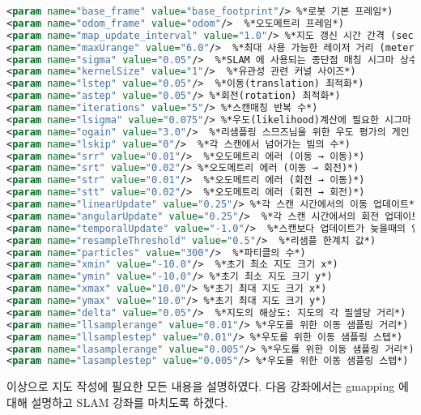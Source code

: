 \vspace{\baselineskip}
\begin{lstlisting}[language=XML]
<param name="base_frame" value="base_footprint"/> %*로봇 기본 프레임*)
<param name="odom_frame" value="odom"/>  %*오도메트리 프레임*)
<param name="map_update_interval" value="1.0"/> %*지도 갱신 시간 간격 (sec)*)
<param name="maxUrange" value="6.0"/>  %*최대 사용 가능한 레이저 거리 (meter)*)
<param name="sigma" value="0.05"/>  %*SLAM 에 사용되는 종단점 매칭 시그마 상수 값*)
<param name="kernelSize" value="1"/>  %*유관성 관련 커널 사이즈*)
<param name="lstep" value="0.05"/>  %*이동(translation) 최적화*)
<param name="astep" value="0.05"/> %*회전(rotation) 최적화*)
<param name="iterations" value="5"/> %*스캔매칭 반복 수*)
<param name="lsigma" value="0.075"/> %*우도(likelihood)계산에 필요한 시그마 값*)
<param name="ogain" value="3.0"/>  %*리샘플링 스므즈님을 위한 우도 평가의 게인 값*)
<param name="lskip" value="0"/>  %*각 스캔에서 넘어가는 빔의 수*)
<param name="srr" value="0.01"/>  %*오도메트리 에러 (이동 → 이동)*)
<param name="srt" value="0.02"/> %*오도메트리 에러 (이동 → 회전)*)
<param name="str" value="0.01"/>  %*오도메트리 에러 (회전 → 이동)*)
<param name="stt" value="0.02"/>  %*오도메트리 에러 (회전 → 회전)*)
<param name="linearUpdate" value="0.25"/> %*각 스캔 시간에서의 이동 업데이트*)
<param name="angularUpdate" value="0.25"/>  %*각 스캔 시간에서의 회전 업데이트*)
<param name="temporalUpdate" value="-1.0"/>  %*스캔보다 업데이트가 늦을때의 업데이트*)
<param name="resampleThreshold" value="0.5"/>  %*리샘플 한계치 값*)
<param name="particles" value="300"/>  %*파티클의 수*)
<param name="xmin" value="-10.0"/>  %*초기 최소 지도 크기 x*)
<param name="ymin" value="-10.0"/> %*초기 최소 지도 크기 y*)
<param name="xmax" value="10.0"/> %*초기 최대 지도 크기 x*)
<param name="ymax" value="10.0"/> %*초기 최대 지도 크기 y*)
<param name="delta" value="0.05"/>  %*지도의 해상도: 지도의 각 필셀당 거리*)
<param name="llsamplerange" value="0.01"/> %*우도를 위한 이동 샘플링 거리*)
<param name="llsamplestep" value="0.01"/> %*우도를 위한 이동 샘플링 스텝*)
<param name="lasamplerange" value="0.005"/> %*우도를 위한 이동 샘플링 거리*)
<param name="lasamplestep" value="0.005"/> %*우도를 위한 이동 샘플링 스텝*)
\end{lstlisting}


이상으로 지도 작성에 필요한 모든 내용을 설명하였다. 다음 강좌에서는 gmapping 에 대해 설명하고 SLAM 강좌를 마치도록 하겠다.


